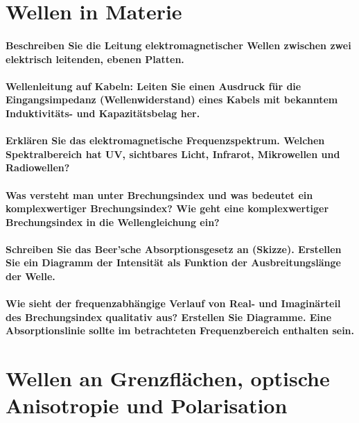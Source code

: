 \documentclass[a4paper, 11pt, parskip=half]{scrartcl}
\begin{document}
\newpage

\section{Wellen in Materie}

\paragraph{Beschreiben Sie die Leitung elektromagnetischer Wellen zwischen zwei elektrisch
leitenden, ebenen Platten.}

\paragraph{Wellenleitung auf Kabeln: Leiten Sie einen Ausdruck für die Eingangsimpedanz
(Wellenwiderstand) eines Kabels mit bekanntem Induktivitäts- und Kapazitätsbelag her.}

\paragraph{Erklären Sie das elektromagnetische Frequenzspektrum. Welchen Spektralbereich hat UV,
sichtbares Licht, Infrarot, Mikrowellen und Radiowellen?}

\paragraph{Was versteht man unter Brechungsindex und was bedeutet ein komplexwertiger
Brechungsindex? Wie geht eine komplexwertiger Brechungsindex in die Wellengleichung ein?}

\paragraph{Schreiben Sie das Beer’sche Absorptionsgesetz an (Skizze). Erstellen Sie ein Diagramm der
Intensität als Funktion der Ausbreitungslänge der Welle.}

\paragraph{Wie sieht der frequenzabhängige Verlauf von Real- und Imaginärteil des Brechungsindex
qualitativ aus? Erstellen Sie Diagramme. Eine Absorptionslinie sollte im betrachteten
Frequenzbereich enthalten sein.}

\newpage

\section{Wellen an Grenzflächen, optische Anisotropie und Polarisation}
\end{document}
